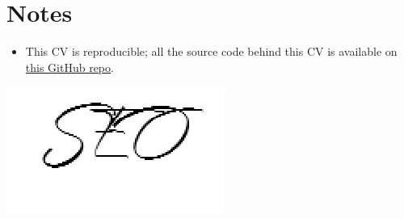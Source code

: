 \documentclass[11pt, a4paper]{awesome-cv}
\providecommand{\tightlist}{%
	\setlength{\itemsep}{0pt}\setlength{\parskip}{0pt}}
\begin{document}
\hypertarget{notes}{%
\section{Notes}\label{notes}}

\begin{itemize}
\tightlist
\item
  This CV is reproducible; all the source code behind this CV is
  available on \href{https://github.com/jooyoungseo/jy_CV}{this GitHub
  repo}.
\end{itemize}

\includegraphics{data/signature.png}\\
\end{document}
